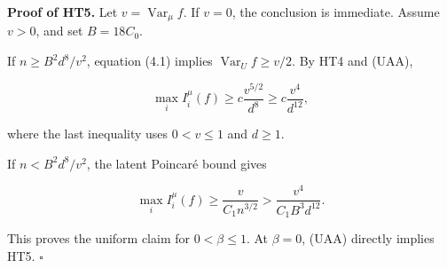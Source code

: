 \textbf{Proof of HT5.} Let \(v=\operatorname{Var}_\mu f\). If \(v=0\), the conclusion is immediate. Assume \(v>0\), and set \(B=18C_0\).

If \(n \ge  B^2 d^8/v^2\), equation (4.1) implies \(\operatorname{Var}_U f\ge v/2\). By HT4 and (UAA),

\[
\max_i I_i^\mu(f)
\ge c\frac{v^{5/2}}{d^8}
\ge c\frac{v^4}{d^{12}},
\]

where the last inequality uses \(0<v\le 1\) and \(d\ge 1\).

If \(n < B^2 d^8/v^2\), the latent Poincaré bound gives

\[
\max_i I_i^\mu(f)
\ge\frac{v}{C_1 n^{3/2}}
>\frac{v^4}{C_1B^3d^{12}}.
\]

This proves the uniform claim for \(0<\beta\le 1\). At \(\beta=0\), (UAA) directly implies HT5. \(\square\)
